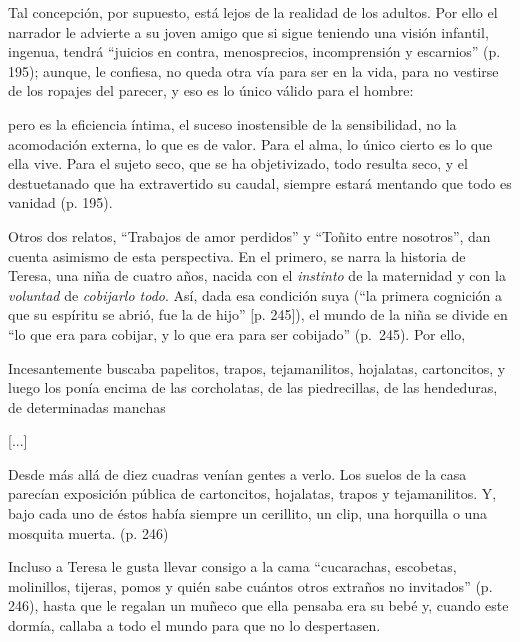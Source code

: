\documentclass[14pt,twoside,final]{extbook} %
\begin{document}
Tal concepción, por supuesto, está lejos de la realidad de los adultos. Por ello el narrador le advierte a su joven amigo que si sigue teniendo una visión infantil, ingenua, tendrá ``juicios en contra, menosprecios, incomprensión y escarnios'' (p. 195); aunque, le confiesa, no queda otra vía para ser en la vida, para no vestirse de los ropajes del parecer, y eso es lo único válido para el
hombre:
\begin{quoting}
pero es la eficiencia íntima, el suceso inostensible de la sensibilidad, no la acomodación externa, lo que es de valor. Para el alma, lo único cierto es lo que ella vive. Para el sujeto seco, que se ha objetivizado, todo resulta seco, y el destuetanado que ha extravertido su caudal, siempre estará mentando que todo es vanidad (p. 195).
\end{quoting}
Otros dos relatos, ``Trabajos de amor perdidos'' y ``Toñito entre nosotros'', dan cuenta asimismo de esta perspectiva. En el primero, se narra la historia de Teresa, una niña de cuatro años, nacida con el \emph{instinto} de la maternidad y con la \emph{voluntad} de \emph{cobijarlo todo}. Así, dada esa condición suya (``la primera cognición a que su espíritu se abrió, fue la de hijo'' [p. 245]), el mundo de la niña se divide en ``lo que era para cobijar, y lo que era para ser cobijado'' (p.~245). Por ello,
\begin{quoting}
Incesantemente buscaba papelitos, trapos, tejamanilitos, hojalatas, cartoncitos, y luego los ponía encima de las corcholatas, de las piedrecillas, de las hendeduras, de determinadas manchas

\centerline{[...]}

Desde más allá de diez cuadras venían gentes a verlo. Los suelos de la casa parecían exposición pública de cartoncitos, hojalatas, trapos y tejamanilitos. Y, bajo cada uno de éstos había siempre un cerillito, un clip, una horquilla o una mosquita muerta. (p. 246)
\end{quoting} 
Incluso a Teresa le gusta llevar consigo a la cama ``cucarachas, escobetas, molinillos, tijeras, pomos y quién sabe cuántos otros extraños no invitados'' (p. 246), hasta que le regalan un muñeco que ella pensaba era su bebé y, cuando este dormía, callaba a todo el mundo para que no lo despertasen.
\end{document}
